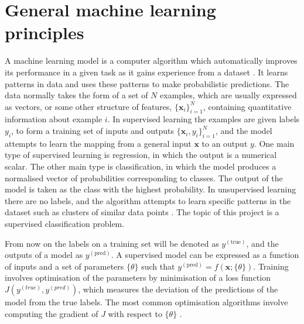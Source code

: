 \documentclass[12pt]{article}
\begin{document}
\section{General machine learning principles}
A machine learning model is a computer algorithm which automatically improves its performance in a given task as it gains experience from a dataset \cite{Goodfellow16}. It learns patterns in data and uses these patterns to make probabilistic predictions. The data normally takes the form of a set of $N$ examples, which are usually expressed as vectors, or some other structure of features, $\{\bm{x}_i\}_{i=1}^N$, containing quantitative information about example $i$. In supervised learning the examples are given labels $y_i$, to form a training set of inputs and outputs $\{\bm{x}_i, y_i\}_{i=1}^N$, and the model attempts to learn the mapping from a general input $\bm{x}$ to an output $y$. One main type of supervised learning is regression, in which the output is a numerical scalar. The other main type is classification, in which the model produces a normalised vector of probabilities corresponding to classes. The output of the model is taken as the class with the highest probability. In unsupervised learning there are no labels, and the algorithm attempts to learn specific patterns in the dataset such as clusters of similar data points \cite{Murphy12}. The topic of this project is a supervised classification problem.

From now on the labels on a training set will be denoted as $y^{(\textrm{true})}$, and the outputs of a model as $y^{(\textrm{pred})}$. A supervised model can be expressed as a function of inputs and a set of parameters $\{\theta\}$ such that $y^{(\textrm{pred})}=f(\bm{x};\{\theta\})$. Training involves optimisation of the parameters by minimisation of a loss function $J(y^{(true)},y^{(pred)})$, which measures the deviation of the predictions of the model from the true labels. The most common optimisation algorithms involve computing the gradient of $J$ with respect to $\{\theta\}$ \cite{Goodfellow16}. 
\end{document}
